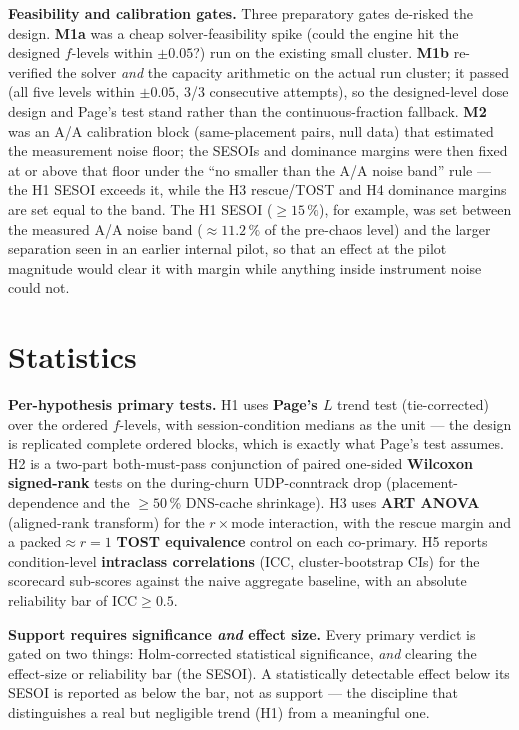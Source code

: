 \textbf{Feasibility and calibration gates.} Three preparatory gates de-risked the
design. \textbf{M1a} was a cheap solver-feasibility spike (could the engine hit
the designed $f$-levels within $\pm 0.05$?) run on the existing small cluster.
\textbf{M1b} re-verified the solver \emph{and} the capacity arithmetic on the
actual run cluster; it passed (all five levels within $\pm 0.05$, 3/3
consecutive attempts), so the designed-level dose design and Page's test stand
rather than the continuous-fraction fallback. \textbf{M2} was an
A/A calibration block (same-placement pairs, null data) that estimated the
measurement noise floor; the SESOIs and dominance margins were then fixed at or
above that floor under the ``no smaller than the A/A noise band''
rule --- the H1 SESOI exceeds it, while the H3 rescue/TOST and H4 dominance
margins are set equal to the band. The H1 SESOI ($\geq 15\,\%$), for example, was set
between the measured A/A noise band ($\approx 11.2\,\%$ of the pre-chaos level)
and the larger separation seen in an earlier internal pilot, so that an effect
at the pilot magnitude would clear it with margin while anything inside
instrument noise could not.

\section{Statistics}\label{sec:statistics}

\textbf{Per-hypothesis primary tests.} H1 uses \textbf{Page's $L$} trend test
(tie-corrected) over the ordered $f$-levels, with session-condition medians as
the unit --- the design is replicated complete ordered blocks, which is exactly
what Page's test assumes. H2 is a two-part both-must-pass conjunction of paired
one-sided \textbf{Wilcoxon signed-rank} tests on the during-churn UDP-conntrack
drop (placement-dependence and the $\geq 50\,\%$ DNS-cache shrinkage). H3 uses
\textbf{ART ANOVA} (aligned-rank transform) for the $r \times \text{mode}$
interaction, with the rescue margin and a packed$\approx r{=}1$
\textbf{TOST equivalence} control on each co-primary. H5 reports condition-level
\textbf{intraclass correlations} (ICC, cluster-bootstrap CIs) for the scorecard
sub-scores against the naive aggregate baseline, with an absolute reliability
bar of $\text{ICC} \geq 0.5$.

\textbf{Support requires significance \emph{and} effect size.} Every
primary verdict is gated on two things: Holm-corrected statistical
significance, \emph{and} clearing the effect-size or reliability bar
(the SESOI). A statistically detectable effect below its SESOI is reported as
below the bar, not as support --- the discipline that distinguishes a real but
negligible trend (H1) from a meaningful one.

